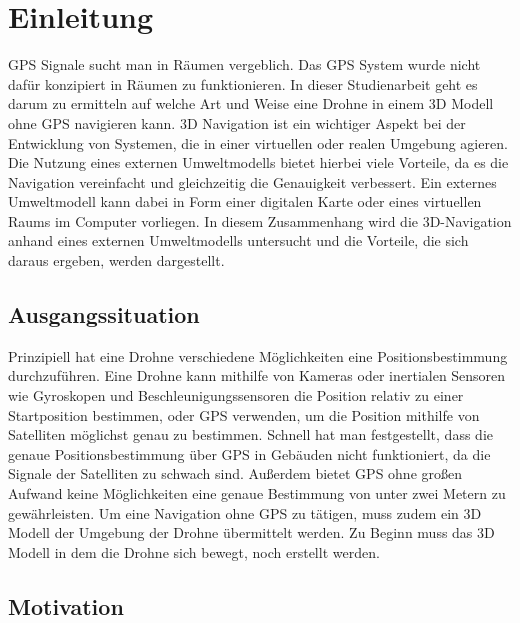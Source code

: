 \chapter{Einleitung}

\ac{GPS} Signale sucht man in Räumen vergeblich. Das \ac{GPS} System wurde nicht dafür konzipiert in Räumen zu funktionieren.
In dieser Studienarbeit geht es darum zu ermitteln auf welche Art und Weise eine Drohne in einem 3D Modell ohne \ac{GPS} navigieren kann.
3D Navigation ist ein wichtiger Aspekt bei der Entwicklung von Systemen, die in einer virtuellen oder realen Umgebung agieren. Die Nutzung eines externen Umweltmodells bietet hierbei viele Vorteile, da es die Navigation vereinfacht und gleichzeitig die Genauigkeit verbessert. Ein externes Umweltmodell kann dabei in Form einer digitalen Karte oder eines virtuellen Raums im Computer vorliegen. In diesem Zusammenhang wird die 3D-Navigation anhand eines externen Umweltmodells untersucht und die Vorteile, die sich daraus ergeben, werden dargestellt.



\section{Ausgangssituation}

Prinzipiell hat eine Drohne verschiedene Möglichkeiten eine Positionsbestimmung durchzuführen.
Eine Drohne kann mithilfe von Kameras oder inertialen Sensoren wie Gyroskopen und Beschleunigungssensoren die Position relativ zu einer Startposition bestimmen, oder \ac{GPS} verwenden, um die Position mithilfe von Satelliten möglichst genau zu bestimmen.
Schnell hat man festgestellt, dass die genaue Positionsbestimmung über \ac{GPS} in Gebäuden nicht funktioniert, da die Signale der Satelliten zu schwach sind. Außerdem bietet \ac{GPS} ohne großen Aufwand keine Möglichkeiten eine genaue Bestimmung von unter zwei Metern zu gewährleisten.
Um eine Navigation ohne GPS zu tätigen, muss zudem ein 3D Modell der Umgebung der Drohne übermittelt werden.
Zu Beginn muss das 3D Modell in dem die Drohne sich bewegt, noch erstellt werden.


\section{Motivation}


